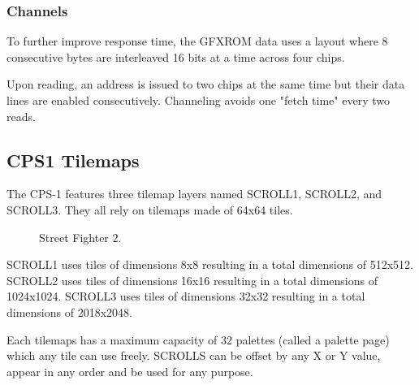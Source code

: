 
 \begin{figure}[H]%
 \end{figure}%


\subsubsection{Channels}
To further improve response time, the GFXROM data uses a layout where 8 consecutive bytes are interleaved 16 bits at a time across four chips. 

Upon reading, an address is issued to two chips at the same time but their data lines are enabled consecutively. Channeling avoids one "fetch time" every two reads.



\subsection{CPS1 Tilemaps}
The CPS-1 features three tilemap layers named SCROLL1, SCROLL2, and SCROLL3. They all rely on tilemaps made of 64x64 tiles.


\vfill
\begin{figure}[!b]
 \caption*{Street Fighter 2.}%
 \end{figure}%
\pagebreak

SCROLL1 uses tiles of dimensions 8x8 resulting in a total dimensions of 512x512. SCROLL2 uses tiles of dimensions 16x16 resulting in a total dimensions of 1024x1024. SCROLL3 uses tiles of dimensions 32x32 resulting in a total dimensions of 2018x2048.



Each tilemaps has a maximum capacity of 32 palettes (called a palette page) which any tile can use freely. SCROLLS can be offset by any X or Y value, appear in any order and be used for any purpose.

